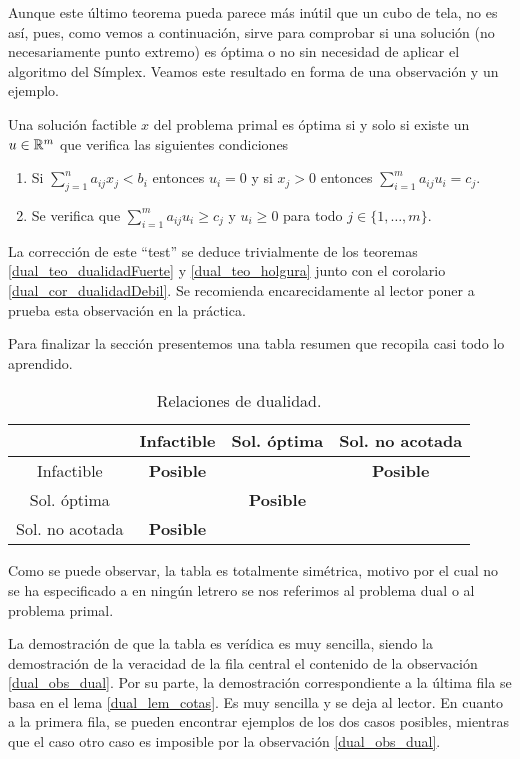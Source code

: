 Aunque este último teorema pueda parece más inútil que un cubo de tela, no es así, pues, como vemos a continuación, sirve para comprobar si una solución (no necesariamente punto extremo) es óptima o no sin necesidad de aplicar el algoritmo del Símplex. Veamos este resultado en forma de una observación y un ejemplo.
\begin{obs}
	Una solución factible $x$ del problema primal es óptima si y solo si existe un $u\in\mathbb{R}^m$ que verifica las siguientes condiciones
	\begin{enumerate}
		\item Si $\sum_{j=1}^{n}a_{ij}x_j<b_i$ entonces $u_i=0$ y si $x_j>0$ entonces $\sum_{i=1}^{m}a_{ij}u_i=c_j$.
		\item Se verifica que $\sum_{i=1}^{m}a_{ij}u_i\geq c_j$ y $u_i\geq 0$ para todo $j\in\{1,\dots,m\}$.
	\end{enumerate}
	La corrección de este ``test'' se deduce trivialmente de los teoremas \ref{dual_teo_dualidadFuerte} y \ref{dual_teo_holgura} junto con el corolario \ref{dual_cor_dualidadDebil}. Se recomienda encarecidamente al lector poner a prueba esta observación en la práctica.
\end{obs}
Para finalizar la sección presentemos una tabla resumen que recopila casi todo lo aprendido.
\begin{table}[H]
	\centering
	\begin{tabular}{c|c|c|c|}
		\multicolumn{1}{l|}{} & Infactible & Sol. óptima & Sol. no acotada \\ \hline
		Infactible & \textbf{Posible} & \cellcolor[HTML]{C0C0C0}{\color[HTML]{FFCCC9} \textbf{}} & \textbf{Posible} \\ \hline
		Sol. óptima & \cellcolor[HTML]{C0C0C0}\textbf{} & \textbf{Posible} & \cellcolor[HTML]{C0C0C0}\textbf{} \\ \hline
		Sol. no acotada & \textbf{Posible} & \cellcolor[HTML]{C0C0C0}\textbf{} & \cellcolor[HTML]{C0C0C0}\textbf{} \\ \hline
	\end{tabular}
	\caption{Relaciones de dualidad.}
\end{table}
Como se puede observar, la tabla es totalmente simétrica, motivo por el cual no se ha especificado a en ningún letrero se nos referimos al problema dual o al problema primal.

La demostración de que la tabla es verídica es muy sencilla, siendo la demostración de la veracidad de la fila central el contenido de la observación \ref{dual_obs_dual}. Por su parte, la demostración correspondiente a la última fila se basa en el lema \ref{dual_lem_cotas}. Es muy sencilla y se deja al lector. En cuanto a la primera fila, se pueden encontrar ejemplos de los dos casos posibles, mientras que el caso otro caso es imposible por la observación \ref{dual_obs_dual}.
